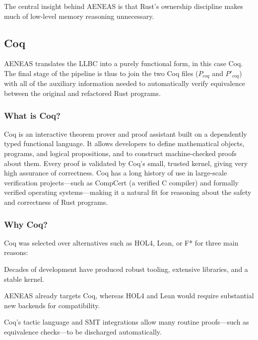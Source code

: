 The central insight behind AENEAS is that Rust's ownership discipline makes much of low-level memory reasoning unnecessary.

\subsection{Coq}

AENEAS translates the LLBC into a purely functional form, in this case Coq. The
final stage of the pipeline is thus to join the two Coq files ($P_{coq}$ and
$P'_{coq}$) with all of the auxiliary information needed to automatically verify
equivalence between the original and refactored Rust programs.

\subsubsection*{What is Coq?}
Coq is an interactive theorem prover and proof assistant built on a dependently
typed functional language. It allows developers to define mathematical objects,
programs, and logical propositions, and to construct machine-checked proofs
about them. Every proof is validated by Coq's small, trusted kernel, giving very
high assurance of correctness. Coq has a long history of use in large-scale
verification projects—such as CompCert (a verified C compiler) and formally
verified operating systems—making it a natural fit for reasoning about the
safety and correctness of Rust programs.

\subsubsection*{Why Coq?}
Coq was selected over alternatives such as HOL4, Lean, or F* for three main reasons:
\begin{description}[leftmargin=!,labelwidth=2.5cm]
    \item[Mature ecosystem] Decades of development have produced robust tooling, extensive libraries, and a stable kernel.
    \item[Direct integration] AENEAS already targets Coq, whereas HOL4 and Lean would require substantial new backends for compatibility.
    \item[Automation] Coq's tactic language and SMT integrations allow many routine proofs—such as equivalence checks—to be discharged automatically.
\end{description}


